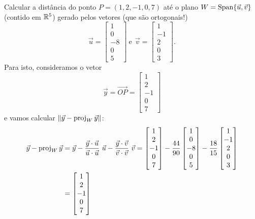 \documentclass[../livro.tex]{subfiles}  %
\begin{document}
\begin{example}
Calcular a distância do ponto $P = (1,2,-1,0,7)$ até o plano $W = \operatorname{Span}\{\vec{u}, \vec{v}\}$ (contido em $\mathbb{R}^5$) gerado pelos vetores (que são ortogonais!)
\[
\vec{u} =
\begin{bmatrix}
1 \\ 0 \\ -8 \\ 0 \\ 5
\end{bmatrix} \ \text{e} \ \
\vec{v} = \begin{bmatrix}
1 \\ -1 \\ 2 \\ 0 \\ 3
\end{bmatrix}.
\] Para isto, consideramos o vetor
\[
\vec{y} = \vec{OP} = \begin{bmatrix}
1 \\ 2 \\ -1 \\ 0 \\ 7
\end{bmatrix}
\]e vamos calcular $\|\vec{y} - \operatorname{proj}_W \vec{y}\|$:
  \begin{align*}
\vec{y} - \operatorname{proj}_W \vec{y} & = \vec{y} - \frac{\vec{y} \cdot \vec{u}}{\vec{u} \cdot \vec{u}} \ \vec{u} - \frac{\vec{y} \cdot \vec{v}}{\vec{v} \cdot \vec{v}} \ \vec{v}  =
\begin{bmatrix}
1 \\ 2 \\ -1 \\ 0 \\ 7
\end{bmatrix} - \frac{44}{90}
\begin{bmatrix}
1 \\ 0 \\ -8 \\ 0 \\ 5
\end{bmatrix} - \frac{18}{15}
\begin{bmatrix}
1 \\ -1 \\ 2 \\ 0 \\ 3
\end{bmatrix} \\
   & = \begin{bmatrix}
1 \\ 2 \\ -1 \\ 0 \\ 7

\end{bmatrix}
\end{align*}
\end{example}
\end{document}
